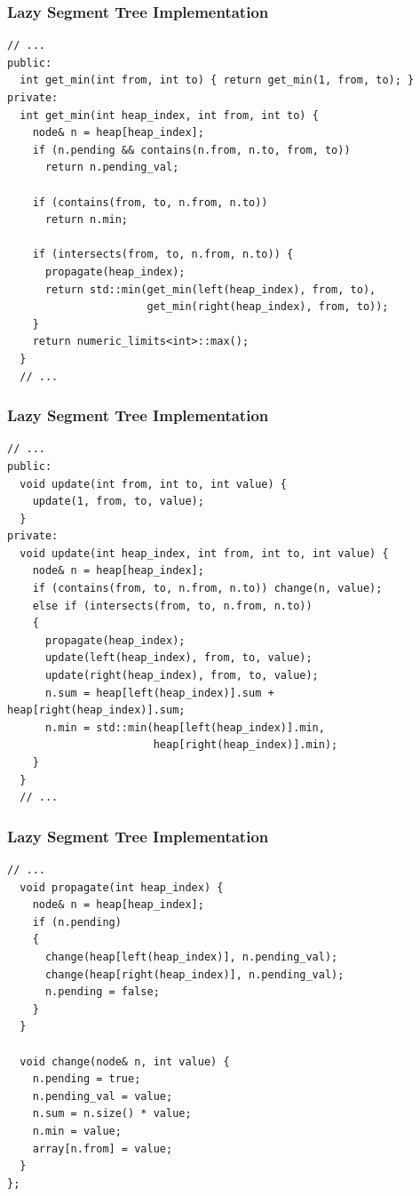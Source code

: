 \documentclass{beamer}
\begin{document}
\begin{frame}[containsverbatim]
\frametitle{Lazy Segment Tree Implementation}

\scriptsize

\begin{lstlisting}[mathescape]
  // ...
public:
  int get_min(int from, int to) { return get_min(1, from, to); }
private:
  int get_min(int heap_index, int from, int to) {
    node& n = heap[heap_index];
    if (n.pending && contains(n.from, n.to, from, to))
      return n.pending_val;

    if (contains(from, to, n.from, n.to))
      return n.min;

    if (intersects(from, to, n.from, n.to)) {
      propagate(heap_index);
      return std::min(get_min(left(heap_index), from, to),
                      get_min(right(heap_index), from, to));
    }
    return numeric_limits<int>::max();
  }
  // ...
\end{lstlisting}

\end{frame}

\begin{frame}[containsverbatim]
\frametitle{Lazy Segment Tree Implementation}

\scriptsize

\begin{lstlisting}[mathescape]
  // ...
public:
  void update(int from, int to, int value) {
    update(1, from, to, value);
  }
private:
  void update(int heap_index, int from, int to, int value) {
    node& n = heap[heap_index];
    if (contains(from, to, n.from, n.to)) change(n, value);
    else if (intersects(from, to, n.from, n.to))
    {
      propagate(heap_index);
      update(left(heap_index), from, to, value);
      update(right(heap_index), from, to, value);
      n.sum = heap[left(heap_index)].sum + heap[right(heap_index)].sum;
      n.min = std::min(heap[left(heap_index)].min,
                       heap[right(heap_index)].min);
    }
  }
  // ...
\end{lstlisting}

\end{frame}

\begin{frame}[containsverbatim]
\frametitle{Lazy Segment Tree Implementation}

\scriptsize

\begin{lstlisting}[mathescape]
  // ...
  void propagate(int heap_index) {
    node& n = heap[heap_index];
    if (n.pending)
    {
      change(heap[left(heap_index)], n.pending_val);
      change(heap[right(heap_index)], n.pending_val);
      n.pending = false;
    }
  }

  void change(node& n, int value) {
    n.pending = true;
    n.pending_val = value;
    n.sum = n.size() * value;
    n.min = value;
    array[n.from] = value;
  }
};
\end{lstlisting}

\end{frame}
\end{document}
